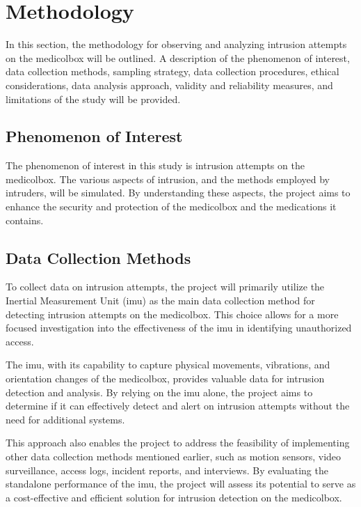 \documentclass[../main.tex]{subfiles}
\begin{document}
    \section{Methodology}
    In this section, the methodology for observing and
    analyzing \gls{intrusion} attempts on the
    \gls{medicolbox} will be outlined.
    A description of the phenomenon of interest,
    data collection methods, sampling strategy,
    data collection procedures, ethical considerations,
    data analysis approach, validity and reliability measures,
    and limitations of the study will be provided.

    \subsection{Phenomenon of Interest}
    The phenomenon of interest in this study is
    \gls{intrusion} attempts on the \gls{medicolbox}.
    The various aspects of \gls{intrusion},
    and the methods employed by intruders,
    will be simulated. By understanding these aspects,
    the project aims to enhance the
    security and protection of the
    \gls{medicolbox} and the medications it contains.

    \subsection{Data Collection Methods}
    To collect data on \gls{intrusion} attempts,
    the project will primarily utilize the
    Inertial Measurement Unit (\gls{imu}) as the
    main data collection method for detecting
    \gls{intrusion} attempts on the \gls{medicolbox}.
    This choice allows for a more focused investigation into the
    effectiveness of the \gls{imu} in identifying unauthorized access.

    The \gls{imu}, with its capability to capture physical movements,
    vibrations, and orientation changes of the \gls{medicolbox},
    provides valuable data for \gls{intrusion} detection and analysis.
    By relying on the \gls{imu} alone,
    the project aims to determine if it can effectively detect and
    alert on \gls{intrusion} attempts without the
    need for additional systems.

    This approach also enables the project to address the
    feasibility of implementing other
    data collection methods mentioned earlier,
    such as motion sensors, video surveillance,
    access logs, incident reports, and interviews.
    By evaluating the standalone performance of the \gls{imu},
    the project will assess its potential to serve as a cost-effective and
    efficient solution for \gls{intrusion} detection on the \gls{medicolbox}.
\end{document}

